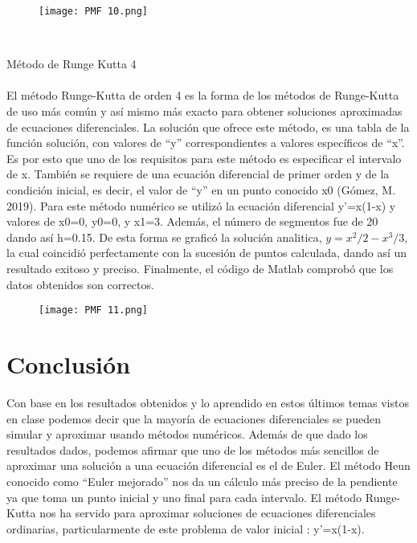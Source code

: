 \documentclass{article}
\begin{document}
\begin{figure}[h!]
\centering
\texttt{[image: PMF 10.png]}
\end{figure}
\\
\newpage

Método de Runge Kutta 4
\\
\\
El método Runge-Kutta de orden 4 es la forma de los métodos de Runge-Kutta de uso más común y así mismo más exacto para obtener soluciones aproximadas de ecuaciones diferenciales. La solución que ofrece este método, es una tabla de la función solución, con valores de “y” correspondientes a valores específicos de “x”.
Es por esto que uno de los requisitos para este método es especificar el intervalo de x. También se requiere de una ecuación diferencial de primer orden y de la condición inicial, es decir, el valor de “y” en un punto conocido x0 (Gómez, M. 2019). Para este método numérico se utilizó la ecuación diferencial y'=x(1-x) y valores de x0=0, y0=0, y x1=3. Además, el número de segmentos fue de 20 dando así h=0.15. De esta forma se graficó la solución analitica, $y=x^2/2 - x^3/3$, la cual coincidió perfectamente con la sucesión de puntos calculada, dando así un resultado exitoso y preciso. Finalmente, el código de Matlab comprobó que los datos obtenidos son correctos.

\begin{figure}[h!]
\centering
\texttt{[image: PMF 11.png]}
\end{figure}

\newpage




 \section{Conclusión}

Con base en los resultados obtenidos y lo aprendido en estos últimos temas vistos en clase podemos decir que la mayoría de ecuaciones diferenciales se pueden simular y aproximar usando métodos numéricos. Además de que dado los resultados dados, podemos afirmar que uno de los métodos más sencillos de aproximar una solución a una ecuación diferencial es el de Euler. El método Heun conocido como “Euler mejorado” nos da un cálculo más preciso de la pendiente ya que toma un punto inicial y uno final para cada intervalo. El método Runge-Kutta nos ha servido para aproximar soluciones de ecuaciones diferenciales ordinarias, particularmente de este problema de valor inicial : y'=x(1-x).
\end{document}
